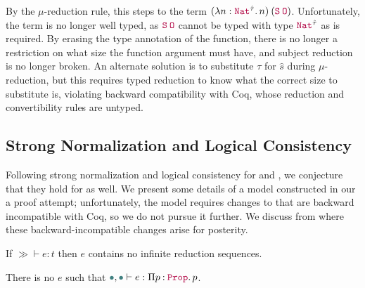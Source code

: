 By the $\mu$-reduction rule, this steps to the term $\app{(\abs{n}{\Nat^{\hat{\tau}}}{n})}{(\app{\Succ}{\Zero})}$.
Unfortunately, the term is no longer well typed, as $\app{\Succ}{\Zero}$ cannot be typed with type $\Nat^{\hat{\tau}}$ as is required.
By erasing the type annotation of the function,
there is no longer a restriction on what size the function argument must have,
and subject reduction is no longer broken.
An alternate solution is to substitute $\tau$ for $\hat{s}$ during $\mu$-reduction,
but this requires typed reduction to know what the correct size to substitute is,
violating backward compatibility with Coq,
whose reduction and convertibility rules are untyped.

\subsection{Strong Normalization and Logical Consistency}\label{sec:metatheory:sn}

Following strong normalization and logical consistency for \CIChatminus and \CChatomega,
we conjecture that they hold for \lang as well.
We present some details of a model constructed in our a proof attempt;
unfortunately, the model requires changes to \lang that are backward
incompatible with Coq, so we do not pursue it further.
We discuss from where these backward-incompatible changes arise for posterity.

\begin{conjecture}\label{thm:metatheory:sn}
  If $\gg \vdash e : t$ then $e$ contains no infinite
  reduction sequences.
\end{conjecture}

\begin{conjecture}\label{thm:metatheory:lc}
  There is no $e$ such that $\mt, \mt \vdash e : \prod{p}{\Prop}{p}$.
\end{conjecture}

\iffalse
Note that strong normalization is a stricter requirement than Coq, which is only \emph{weakly} normalizing:
every well-typed term has \emph{some} finite reduction sequence.
This relaxation enables more programs to pass the guard predicates while still being consistent.
For instance, the first fixpoint definition is accepted, as \texttt{x} is never used,
but the second is not.

\begin{verbatim}
Fixpoint f (u: unit): unit := let x := f u in tt.
Fail Fixpoint f (u: unit): False := let x := f u in x.
\end{verbatim}
\fi

